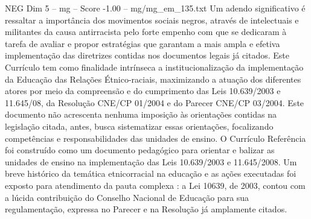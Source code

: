\begin{textsample}{NEG Dim 5 – mg – Score -1.00 – mg/mg\_em\_135.txt}
Um adendo significativo é ressaltar a importância dos movimentos sociais negros, através de intelectuais e militantes da causa antirracista pelo forte empenho com que se dedicaram à tarefa de avaliar e propor estratégias que garantam a mais ampla e efetiva implementação das diretrizes contidas nos documentos legais já citados.
Este Currículo tem como finalidade intrínseca a institucionalização da implementação da Educação das Relações Étnico-raciais, maximizando a atuação dos diferentes atores por meio da compreensão e do cumprimento das Leis 10.639/2003 e 11.645/08, da Resolução CNE/CP 01/2004 e do Parecer CNE/CP 03/2004.
Este documento não acrescenta nenhuma imposição às orientações contidas na legislação citada, antes, busca sistematizar essas orientações, focalizando competências e responsabilidades das unidades de ensino.
O Currículo Referência foi construído como um documento pedagógico para orientar e balizar as unidades de ensino na implementação das Leis 10.639/2003 e 11.645/2008.
Um breve histórico da temática etnicorracial na educação e as ações executadas foi exposto para atendimento da pauta complexa : a Lei 10639, de 2003, contou com a lúcida contribuição do Conselho Nacional de Educação para sua regulamentação, expressa no Parecer e na Resolução já amplamente citados.

\end{textsample}
